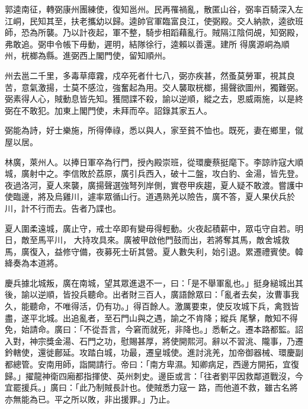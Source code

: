 \begin{pinyinscope}
 郭逵南征，轉弼康州團練使，復知邕州。民再罹禍亂，散匿山谷，弼率百騎深入左江峒，民知其至，扶老攜幼以歸。逵帥官軍臨富良江，使弼殿。交人納款，逵欲班師，恐為所襲。乃以計夜起，軍不整，騎步相蹈藉亂行。賊隔江陰伺覘，知弼殿，弗敢追。弼申令帳下毋動，遲明，結隊徐行，逵賴以善還。建所
 得廣源峒為順州，桄榔為縣。進弼西上閣門使，留知順州。



 州去邕二千里，多毒草瘴霧，戍卒死者什七八，弼亦疾甚，然蚤莫勞軍，視其良苦，意氣激揚，士莫不感泣，強奮起為用。交人襲取桄榔，揚聲欲圖州，獨難弼。弼素得人心，賊動息皆先知。獲間諜不殺，諭以逆順，縱之去，恩威兩施，以是終弼在不敢犯。加東上閣門使，未拜而卒。詔錄其家五人。



 弼能為詩，好士樂施，所得俸祿，悉以與人，家至貧不恤也。既死，妻在鄉里，僦屋以居。



 林廣，萊州人。以捧日軍卒為行門，授內殿崇班，從環慶蔡挺麾下。李諒祚寇大順城，廣射中之。李信敗於荔原，廣引兵西入，破十二盤，攻白豹、金湯，皆先登。夜過洛河，夏人來襲，廣揚聲選強弩列岸側，實卷甲疾趨，夏人疑不敢渡。嘗護中使臨邊，將及烏雞川，遽率眾循山行。道遇熟羌以險告，廣不答，夏人果伏兵於川，計不行而去。告者乃諜也。



 夏人圍柔遠城，廣止守，戒士卒即有變毋得輕動。火夜起積薪中，眾屯守自若。明日，敵至馬平川，
 大持攻具來。廣被甲啟他門鼓而出，若將奪其馬，敵舍城救馬，廣復入，益修守備，夜募死士斫其營。夏人數失利，始引退。累遷禮賓使。韓絳奏為本道將。



 慶兵據北城叛，廣在南城，望其眾進退不一，曰：「是不舉軍亂也。」挺身縋城出其後，諭以逆順，皆投兵聽命。出者財三百人，廣語餘眾曰：「亂者去矣，汝曹事我久，能聽命，不唯得活，仍有功。」得百餘人。激厲要束，使反攻城下兵，禽戮皆盡，遂平北城。出追亂者，至石門山與之遇，諭之不肯降；縱兵
 尾擊，敵知不得免，始請命。廣曰：「不從吾言，今窘而就死，非降也。」悉斬之。遷本路都監。詔入對，神宗獎金湯、石門之功，慰賜甚厚，將使開熙河。辭以不習洮、隴事，乃遷鈐轄使，還徙鄜延。攻踏白城，功最，遷皇城使。進討洮羌，加帝御器械、環慶副都總管。安南用師，詣闕請行。帝曰：「南方卑濕。知卿病足，西邊方開拓，宜復歸。」擢龍神衛四廂都指揮使、英州刺史。邊臣或言：「往者劉平因救鄰道戰沒，今宜罷援兵。」廣曰：「此乃制賊長計也。使賊悉力寇一
 路，而他道不救，雖古名將亦無能為已。平之所以敗，非出援罪。」乃止。




\end{pinyinscope}
